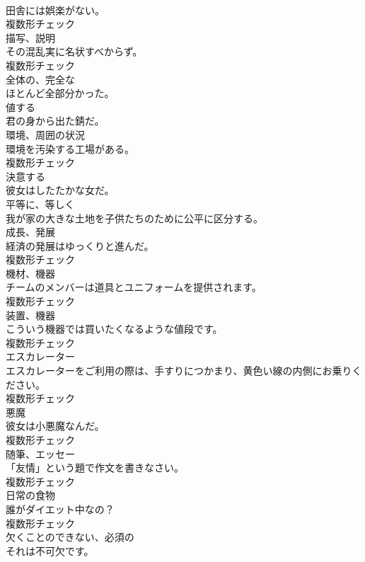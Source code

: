 \documentclass[8pt]{extreport}
\begin{document}
\begin{CJK}{UTF8}{min}
\\	田舎には娯楽がない。	
\\	複数形チェック
\\	[名詞]	描写、説明	
\\	その混乱実に名状すべからず。	
\\	複数形チェック
\\	[形容詞]	全体の、完全な	
\\	ほとんど全部分かった。	
\\	[動詞]	値する	
\\	君の身から出た錆だ。	
\\	[名詞]	環境、周囲の状況	
\\	環境を汚染する工場がある。	
\\	複数形チェック
\\	[動詞]	決意する	
\\	彼女はしたたかな女だ。	
\\	[副詞]	平等に、等しく	
\\	我が家の大きな土地を子供たちのために公平に区分する。	
\\	[名詞]	成⻑、発展	
\\	経済の発展はゆっくりと進んだ。	
\\	複数形チェック
\\	[名詞]	機材、機器	
\\	チームのメンバーは道具とユニフォームを提供されます。	
\\	複数形チェック
\\	[名詞]	装置、機器	
\\	こういう機器では買いたくなるような値段です。	
\\	複数形チェック
\\	[名詞]	エスカレーター	
\\	エスカレーターをご利用の際は、手すりにつかまり、黄色い線の内側にお乗りください。	
\\	複数形チェック
\\	[名詞]	悪魔	
\\	彼女は小悪魔なんだ。	
\\	複数形チェック
\\	[名詞]	随筆、エッセー	
\\	「友情」という題で作文を書きなさい。	
\\	複数形チェック
\\	[名詞]	日常の食物	
\\	誰がダイエット中なの？	
\\	複数形チェック
\\	[形容詞]	欠くことのできない、必須の	
\\	それは不可欠です。	

\end{CJK}
\end{document}
